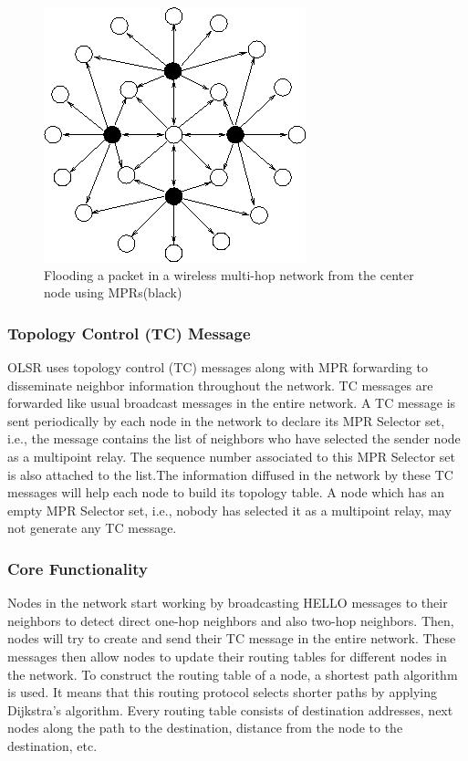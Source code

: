 \documentclass[12pt,a4paper]{report}
\begin{document}
\begin{figure}[hbtp]
\centering
\includegraphics[scale=.5]{mpr.png}
\caption{Flooding a packet in a wireless multi-hop network from the center node using MPRs(black)}
\end{figure}


\subsubsection{Topology Control (TC) Message}
OLSR uses topology control (TC) messages along with MPR forwarding to disseminate neighbor information throughout the network. TC messages are forwarded like usual broadcast messages in the entire network. A TC message is sent periodically by each node in the network to declare its MPR Selector set, i.e., the message contains the list of neighbors who have selected the sender node as a multipoint relay. The sequence number associated to this MPR Selector set is also attached to the list.The information diffused in the network by these TC messages will help each node to build its topology table. A node which has an empty MPR Selector set, i.e., nobody has selected it as a multipoint relay, may not generate any TC message.

\subsubsection{Core Functionality}
Nodes in the network start working by broadcasting HELLO messages to their
neighbors to detect direct one-hop neighbors and also two-hop neighbors. Then,
nodes will try to create and send their TC message in the entire network. These
messages then allow nodes to update their routing tables for different nodes in the
network. To construct the routing table of a node, a shortest path algorithm is used. It means that this routing protocol selects shorter paths by applying Dijkstra’s algorithm. Every routing table consists of destination addresses, next nodes along
the path to the destination, distance from the node to the destination, etc. 
\end{document}
